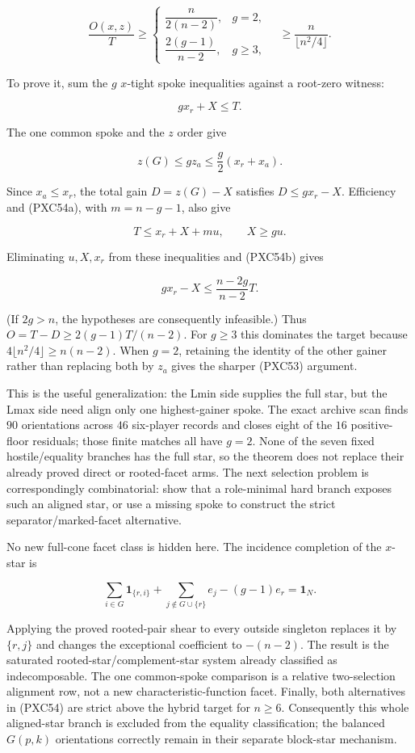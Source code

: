 \documentclass[11pt]{article}
\newcommand{\one}{\mathbf 1}
\begin{document}
\[
 \boxed{
 \frac{O(x,z)}T\ge
 \begin{cases}
  \dfrac{n}{2(n-2)},&g=2,\\[4pt]
  \dfrac{2(g-1)}{n-2},&g\ge3,
 \end{cases}
 \quad\ge\frac{n}{\lfloor n^2/4\rfloor}.}            \tag{PXC54}
\]

To prove it, sum the $g$ $x$-tight spoke inequalities against a root-zero
witness:

\[
 gx_r+X\le T.                                        \tag{PXC54b}
\]

The one common spoke and the $z$ order give

\[
 z(G)\le gz_a\le\frac g2(x_r+x_a).
\]

Since $x_a\le x_r$, the total gain $D=z(G)-X$ satisfies
$D\le gx_r-X$.  Efficiency and (PXC54a), with
$m=n-g-1$, also give

\[
 T\le x_r+X+mu,\qquad X\ge gu.
\]

Eliminating $u,X,x_r$ from these inequalities and (PXC54b) gives

\[
 gx_r-X\le\frac{n-2g}{n-2}T.                         \tag{PXC54c}
\]

(If $2g>n$, the hypotheses are consequently infeasible.)  Thus
$O=T-D\ge2(g-1)T/(n-2)$.  For $g\ge3$ this dominates the target because
$4\lfloor n^2/4\rfloor\ge n(n-2)$.  When $g=2$, retaining the identity of
the other gainer rather than replacing both by $z_a$ gives the sharper
(PXC53) argument.

This is the useful generalization: the Lmin side supplies the full star, but
the Lmax side need align only one highest-gainer spoke.  The exact archive
scan finds $90$ orientations across $46$ six-player records and closes eight
of the $16$ positive-floor residuals; those finite matches all have $g=2$.
None of the seven fixed hostile/equality branches has the full star, so the
theorem does not replace their already proved direct or rooted-facet arms.
The next selection problem is correspondingly combinatorial: show that a
role-minimal hard branch exposes such an aligned star, or use a missing spoke
to construct the strict separator/marked-facet alternative.

No new full-cone facet class is hidden here.  The incidence completion of the
$x$-star is

\[
 \sum_{i\in G}\one_{\{r,i\}}
 +\sum_{j\notin G\cup\{r\}}e_j-(g-1)e_r=\one_N.      \tag{PXC54d}
\]

Applying the proved rooted-pair shear to every outside singleton replaces it
by $\{r,j\}$ and changes the exceptional coefficient to $-(n-2)$.  The
result is the saturated rooted-star/complement-star system already classified
as indecomposable.  The one common-spoke comparison is a relative
two-selection alignment row, not a new characteristic-function facet.
Finally, both alternatives in (PXC54) are strict above the hybrid target for
$n\ge6$.  Consequently this whole aligned-star branch is excluded from the
equality classification; the balanced $G(p,k)$ orientations correctly remain
in their separate block-star mechanism.
\end{document}
